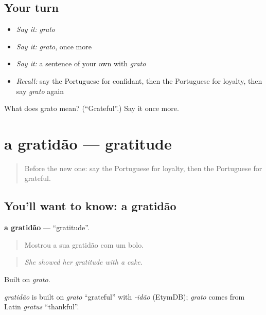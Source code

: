 \subsection*{Your turn}
\begin{itemize}
\raggedright
  \item \emph{Say it:} \emph{grato}
  \item \emph{Say it:} \emph{grato}, once more
  \item \emph{Say it:} a sentence of your own with \emph{grato}
  \item \emph{Recall:} say the Portuguese for confidant, then the Portuguese for loyalty, then say \emph{grato} again
\end{itemize}

\begin{tcolorbox}[breakable,colback=teal!4,colframe=teal!35!black,title={Before you move on}]
What does grato mean? (\textquotedblleft{}Grateful\textquotedblright{}.) Say it once more.
\end{tcolorbox}
\section[a gratidão]{a gratidão — gratitude}

\label{lesson:PT-C499-gratidao}



\begin{quote}
Before the new one: say the Portuguese for loyalty, then the Portuguese for grateful.
\end{quote}

\subsection*{You'll want to know: a gratidão}
\textbf{a gratidão} — \textquotedblleft{}gratitude\textquotedblright{}.

\begin{quote}
Mostrou a sua gratidão com um bolo.
\end{quote}

\begin{quote}
\emph{She showed her gratitude with a cake.}
\end{quote}

Built on \emph{grato}.

\begin{cousinweb}
\emph{gratidão} is built on \emph{grato} \textquotedblleft{}grateful\textquotedblright{} with \emph{-idão} (EtymDB); \emph{grato} comes from Latin \emph{grātus} \textquotedblleft{}thankful\textquotedblright{}.
\end{cousinweb}

